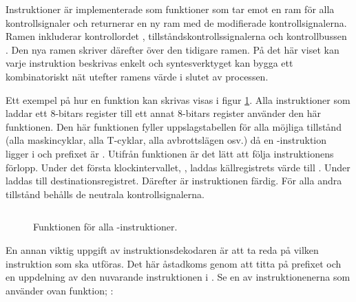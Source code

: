 \documentclass[main.tex]{subfiles}
\begin{document}
Instruktioner är implementerade som funktioner som tar emot en ram  för
alla kontrollsignaler och returnerar en ny ram med de modifierade
kontrollsignalerna. Ramen inkluderar kontrollordet ,
tillståndskontrollssignalerna  och kontrollbussen . Den nya
ramen skriver därefter över den tidigare ramen. På det här viset kan varje
instruktion beskrivas enkelt och syntesverktyget kan bygga ett kombinatoriskt
nät utefter ramens värde i slutet av processen.

Ett exempel på hur en funktion kan skrivas visas i figur \ref{fig:ld}. Alla
instruktioner som laddar ett 8-bitars register till ett annat 8-bitars register
använder den här funktionen. Den här funktionen fyller uppslagstabellen för
alla möjliga tillstånd (alla maskincyklar, alla T-cyklar, alla avbrottslägen
osv.) då en -instruktion ligger i  och prefixet är
. Utifrån funktionen är det lätt att följa instruktionens förlopp.
Under det första klockintervallet, , laddas källregistrets värde
till . Under  laddas  till
destinationsregistret. Därefter är instruktionen färdig. För alla andra
tillstånd behålls de neutrala kontrollsignalerna.
\begin{figure}
    \inputminted{vhdl}{lst/vhdl_instr.vhd}
    \caption{Funktionen för alla -instruktioner.}
    \label{fig:ld}
\end{figure}

En annan viktig uppgift av instruktionsdekodaren är att ta reda på vilken
instruktion som ska utföras. Det här åstadkoms genom att titta på prefixet och
en uppdelning av den nuvarande instruktionen i . Se en av
instruktionenerna som använder ovan funktion; :
\end{document}
